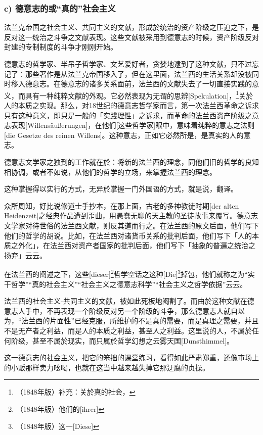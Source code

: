\documentclass[a4paper,12pt]{ctexart}
\begin{document}

\subsubsection{c) 德意志的或“真的”社会主义}

法兰克帝国之社会主义、共同主义的文献，形成於统治的资产阶级之压迫之下，是反对这一统治之斗争之文献表现。这些文献被采用到德意志的时候，资产阶级反对封建的专制制度的斗争才刚刚开始。

德意志的哲学家、半吊子哲学家、文艺爱好者，贪婪地逮到了这种文献，只不过忘记了：那些著作是从法兰克帝国移入了，但在这里面，法兰西的生活关系却没被同时移入德意志。在德意志的诸多关系面前，法兰西的文献失去了一切直接实践的意义，而具有一种纯粹文献的外观。它必然表现为无谓的思辨[Spekulation]，\footnote{（1848年版）补充：关於真的社会，}关於人的本质之实现。那么，对18世纪的德意志哲学家而言，第一次法兰西革命之诉求只有这种意义，即只是一般的「实践理性」之诉求，而革命的法兰西资产阶级之意志表现[Willensäußerungen]，在他们[这些哲学家]眼中，意味着纯粹的意志之法则[die Gesetze des reinen Willens]。这种意志，正如它必然所是，是真实的人的意志。

德意志文学家之独到的工作就在於：将新的法兰西的理念，同他们旧的哲学的良知相协调，或者不如说，从他们的哲学的立场，来掌握法兰西的理念。

这种掌握得以实行的方式，无异於掌握一门外国语的方式，就是说，翻译。

众所周知，好比说修道士手抄本，在那上面，古老的多神教徒时期[der alten Heidenzeit]之经典作品遭到歪曲，用愚蠢无聊的天主教的圣徒故事来覆写。德意志文学家对待世俗的法兰西文献，则反其道而行之。在法兰西的原文后面，他们写下他们的哲学的胡说。比如，在法兰西对诸货币关系的批判后面，他们写下「人的本质之外化」，在法兰西对资产者国家的批判后面，他们写下「抽象的普遍之统治之扬弃」云云。

在法兰西的阐述之下，这些[dieser]\footnote{（1848年版）他们的[ihrer]}哲学空话之这种[Die]\footnote{（1848年版）这一[Diese]}掉包，他们就称之为“实干哲学”“真的社会主义”“社会主义之德意志科学”“社会主义之哲学依据”云云。


法兰西的社会主义-共同主义的文献，被如此死板地阉割了。而由於这种文献在德意志人手中，不再表现一个阶级反对另一个阶级的斗争，那么德意志人就自以为，“法兰西的片面性”已经克服，所维护的不是真的需要，而是真理之需要，并且不是无产者之利益，而是人的本质之利益，甚至人之利益。这里说的人，不属於任何阶级，甚至不属於现实，而只属於哲学幻想之云雾天国[Dunsthimmel]。

这一德意志的社会主义，把它的笨拙的课堂练习，看得如此严肃郑重，还像市场上的小贩那样卖力吆喝，也就在这当中越来越失掉它那迂腐的贞操。
\end{document}
